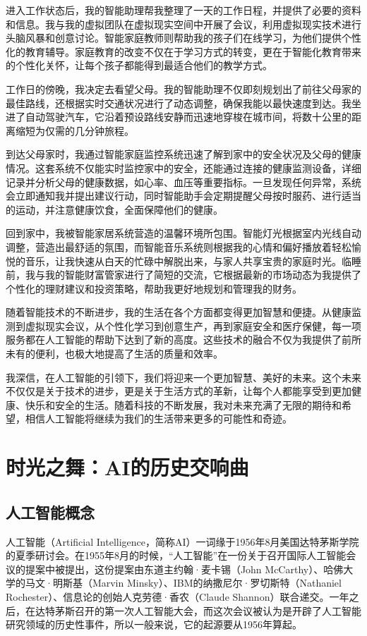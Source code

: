 进入工作状态后，我的智能助理帮我整理了一天的工作日程，并提供了必要的资料和信息。我与我的虚拟团队在虚拟现实空间中开展了会议，利用虚拟现实技术进行头脑风暴和创意讨论。智能家庭教师则帮助我的孩子们在线学习，为他们提供个性化的教育辅导。家庭教育的改变不仅在于学习方式的转变，更在于智能化教育带来的个性化关怀，让每个孩子都能得到最适合他们的教学方式。

工作日的傍晚，我决定去看望父母。我的智能助理不仅即刻规划出了前往父母家的最佳路线，还根据实时交通状况进行了动态调整，确保我能以最快速度到达。我坐进了自动驾驶汽车，它沿着预设路线安静而迅速地穿梭在城市间，将数十公里的距离缩短为仅需的几分钟旅程。

到达父母家时，我通过智能家庭监控系统迅速了解到家中的安全状况及父母的健康情况。这套系统不仅能实时监控家中的安全，还能通过连接的健康监测设备，详细记录并分析父母的健康数据，如心率、血压等重要指标。一旦发现任何异常，系统会立即通知我并提出建议行动，同时智能助手会定期提醒父母按时服药、进行适当的运动，并注意健康饮食，全面保障他们的健康。

回到家中，我被智能家居系统营造的温馨环境所包围。智能灯光根据室内光线自动调整，营造出最舒适的氛围，而智能音乐系统则根据我的心情和偏好播放着轻松愉悦的音乐，让我快速从白天的忙碌中解脱出来，与家人共享宝贵的家庭时光。临睡前，我与我的智能财富管家进行了简短的交流，它根据最新的市场动态为我提供了个性化的理财建议和投资策略，帮助我更好地规划和管理我的财务。

随着智能技术的不断进步，我的生活在各个方面都变得更加智慧和便捷。从健康监测到虚拟现实会议，从个性化学习到创意生产，再到家庭安全和医疗保健，每一项服务都在人工智能的帮助下达到了新的高度。这些技术的融合不仅为我提供了前所未有的便利，也极大地提高了生活的质量和效率。

我深信，在人工智能的引领下，我们将迎来一个更加智慧、美好的未来。这个未来不仅仅是关于技术的进步，更是关于生活方式的革新，让每个人都能享受到更加健康、快乐和安全的生活。随着科技的不断发展，我对未来充满了无限的期待和希望，相信人工智能将继续为我们的生活带来更多的可能性和奇迹。

\section{时光之舞：AI的历史交响曲}
\subsection{人工智能概念}

人工智能（Artificial Intelligence，简称AI）一词缘于1956年8月美国达特茅斯学院的夏季研讨会。在1955年8月的时候，“人工智能”在一份关于召开国际人工智能会议的提案中被提出，这份提案由东道主约翰·麦卡锡（John McCarthy）、哈佛大学的马文·明斯基（Marvin Minsky）、IBM的纳撒尼尔·罗切斯特（Nathaniel Rochester）、信息论的创始人克劳德·香农（Claude Shannon）联合递交。一年之后，在达特茅斯召开的第一次人工智能大会，而这次会议被认为是开辟了人工智能研究领域的历史性事件，所以一般来说，它的起源要从1956年算起。

